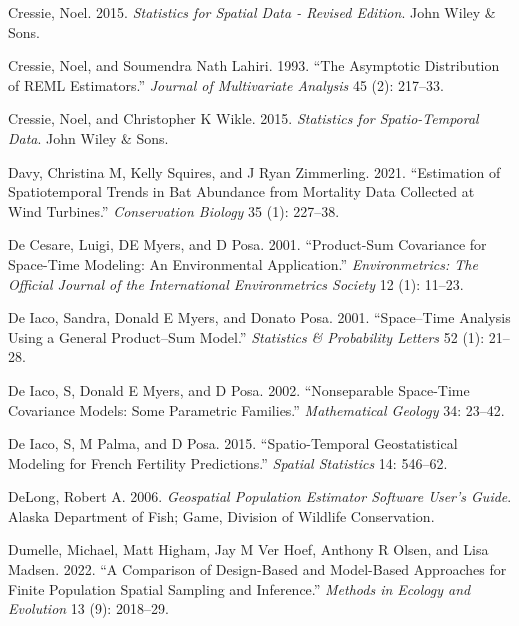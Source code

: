 \documentclass[smallextended]{svjour3}       %
\newlength{\cslhangindent}
\newlength{\cslentryspacingunit} %
\newenvironment{CSLReferences}[2] %
 {%
  \setlength{\parindent}{0pt}
  \ifodd #1
  \let\oldpar\par
  \def\par{\hangindent=\cslhangindent\oldpar}
  \fi
  \setlength{\parskip}{#2\cslentryspacingunit}
 }%
 {}
\begin{document}
\begin{CSLReferences}{1}{0}
\leavevmode{}%
Cressie, Noel. 2015. \emph{Statistics for Spatial Data - Revised
Edition}. John Wiley \& Sons.

\leavevmode{}%
Cressie, Noel, and Soumendra Nath Lahiri. 1993. {``The Asymptotic
Distribution of REML Estimators.''} \emph{Journal of Multivariate
Analysis} 45 (2): 217--33.

\leavevmode{}%
Cressie, Noel, and Christopher K Wikle. 2015. \emph{Statistics for
Spatio-Temporal Data}. John Wiley \& Sons.

\leavevmode{}%
Davy, Christina M, Kelly Squires, and J Ryan Zimmerling. 2021.
{``Estimation of Spatiotemporal Trends in Bat Abundance from Mortality
Data Collected at Wind Turbines.''} \emph{Conservation Biology} 35 (1):
227--38.

\leavevmode{}%
De Cesare, Luigi, DE Myers, and D Posa. 2001. {``Product-Sum Covariance
for Space-Time Modeling: An Environmental Application.''}
\emph{Environmetrics: The Official Journal of the International
Environmetrics Society} 12 (1): 11--23.

\leavevmode{}%
De Iaco, Sandra, Donald E Myers, and Donato Posa. 2001. {``Space--Time
Analysis Using a General Product--Sum Model.''} \emph{Statistics \&
Probability Letters} 52 (1): 21--28.

\leavevmode{}%
De Iaco, S, Donald E Myers, and D Posa. 2002. {``Nonseparable Space-Time
Covariance Models: Some Parametric Families.''} \emph{Mathematical
Geology} 34: 23--42.

\leavevmode{}%
De Iaco, S, M Palma, and D Posa. 2015. {``Spatio-Temporal Geostatistical
Modeling for French Fertility Predictions.''} \emph{Spatial Statistics}
14: 546--62.

\leavevmode{}%
DeLong, Robert A. 2006. \emph{Geospatial Population Estimator Software
User's Guide}. Alaska Department of Fish; Game, Division of Wildlife
Conservation.

\leavevmode{}%
Dumelle, Michael, Matt Higham, Jay M Ver Hoef, Anthony R Olsen, and Lisa
Madsen. 2022. {``A Comparison of Design-Based and Model-Based Approaches
for Finite Population Spatial Sampling and Inference.''} \emph{Methods
in Ecology and Evolution} 13 (9): 2018--29.


\end{CSLReferences}
\end{document}

